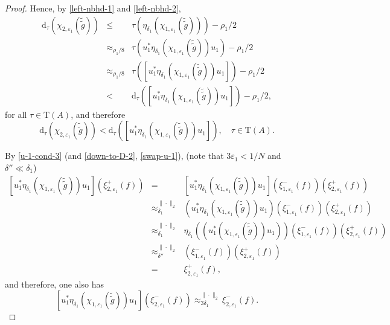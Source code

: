 \documentclass[12pt, oneside, psamsfonts]{amsart}
\theoremstyle{definition}
\theoremstyle{remark}
\numberwithin{equation}{section}
\newcommand{\norm}[1]{\| #1\|}
\newcommand{\eps}{\varepsilon}
\newcommand{\tr}{\mathrm{T}}
\begin{document}
\begin{proof}
Hence, by \eqref{left-nbhd-1} and \eqref{left-nbhd-2},
\begin{eqnarray*}
\mathrm{d}_\tau(\chi_{2, \eps_1}(\tilde{\tilde{g}})) & \leq &  \tau(\eta_{\delta_1}(\chi_{1, \eps_1}(\tilde{\tilde{g}}))) -\rho_1/2 \\
& \approx_{\rho_1/8} & \tau(u^*_1\eta_{\delta_1}(\chi_{1, \eps_1}(\tilde{\tilde{g}}))u_1) - \rho_1/2 \\
& \approx_{\rho_1/8} & \tau([u^*_1\eta_{\delta_1}(\chi_{1, \eps_1}(\tilde{\tilde{g}}))u_1]) - \rho_1/2  \\
& < & \mathrm{d}_\tau([u^*_1\eta_{\delta_1}(\chi_{1, \eps_1}(\tilde{\tilde{g}}))u_1]) - \rho_1/2,
\end{eqnarray*}
for all $\tau \in \tr(A)$,
and therefore
\begin{equation}\label{lem-cond-1}
\mathrm{d}_\tau(\chi_{2, \eps_1}(\tilde{\tilde{g}})) < \mathrm{d}_\tau([u^*_1\eta_{\delta_1}(\chi_{1, \eps_1}(\tilde{\tilde{g}}))u_1]),\quad \tau \in\tr(A). 
\end{equation}





By \eqref{u-1-cond-3} (and \eqref{down-to-D-2}, \eqref{swap-u-1}), (note that $3\eps_1 < 1/N$ and $\delta''\ll \delta_1$)
\begin{eqnarray}\label{left-nbhd-3}
  [u^*_1\eta_{\delta_1}(\chi_{1, \eps_1}(\tilde{\tilde{g}}))u_1] (\xi^+_{2, \eps_1}(f)) & = & [u^*_1\eta_{\delta_1}(\chi_{1, \eps_1}(\tilde{\tilde{g}}))u_1]  (\xi^-_{1, \eps_1}(f))   (\xi^+_{2, \eps_1}(f))  \\
  & \approx_{\delta_1}^{\norm{\cdot}_2}& (u^*_1\eta_{\delta_1}(\chi_{1, \eps_1}(\tilde{\tilde{g}}))u_1)  (\xi^-_{1, \eps_1}(f))   (\xi^+_{2, \eps_1}(f)) \nonumber \\ 
  & \approx_{\delta_1}^{\norm{\cdot}_2}& \eta_{\delta_1}((u^*_1(\chi_{1, \eps_1}(\tilde{\tilde{g}}))u_1))  (\xi^-_{1, \eps_1}(f))   (\xi^+_{2, \eps_1}(f))  \nonumber \\ 
  & \approx_{\delta''}^{\norm{\cdot}_2} & (\xi^-_{1, \eps_1}(f))   (\xi^+_{2, \eps_1}(f)) \nonumber  \\
  & = &   \xi^+_{2, \eps_1}(f), \nonumber
  \end{eqnarray}
and therefore, one also has 
\begin{equation}\label{left-nbhd-4}
  [u^*_1\eta_{\delta_1}(\chi_{1, \eps_1}(\tilde{\tilde{g}}))u_1] (\xi^-_{2, \eps_1}(f)) \approx^{\norm{\cdot}_2}_{3\delta_1} \xi^-_{2, \eps_1}(f). 
\end{equation}  


\end{proof}
\end{document}
